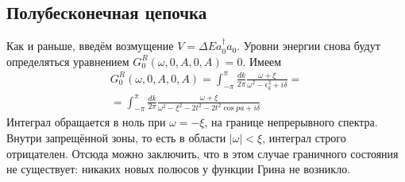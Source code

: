 \subsection{Полубесконечная цепочка}
Как и раньше, введём возмущение $V = \Delta E a_0^\dagger a_0$. Уровни энергии снова 
будут определяться уравнением
$G_0^R(\omega,0,A,0,A) = 0 $.
Имеем 
\begin{multline}
	G_0^R(\omega,0,A,0,A) = \int_{-\pi}^{\pi} \frac{dk}{2\pi}
			\frac{\omega + \xi}{\omega^2 - \epsilon_k^2 + i\delta} =  \\
					=\int_{-\pi}^{\pi} \frac{dk}{2\pi} 
			\frac{\omega + \xi}{\omega^2 - \xi^2 - 2t^2 - 2t^2\cos{pa} + i\delta} 
\end{multline}
Интеграл обращается в ноль при $\omega = -\xi$, на границе непрерывного спектра. Внутри
запрещённой зоны, то есть в области $|\omega| < \xi$, интеграл строго отрицателен. Отсюда
можно заключить, что в этом случае граничного состояния не существует: никаких новых
полюсов у функции Грина не возникло.

